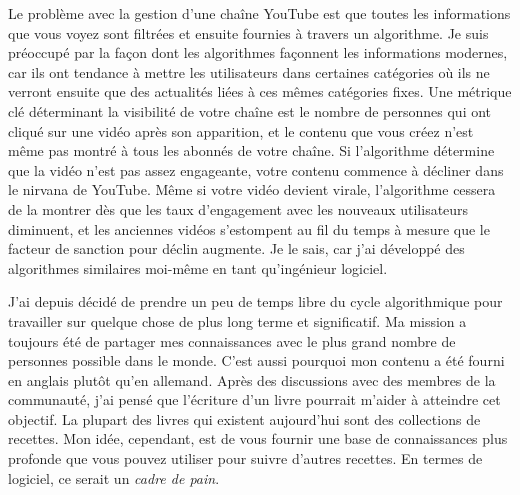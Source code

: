 Le problème avec la gestion d'une chaîne YouTube est que toutes les informations que vous voyez sont filtrées et ensuite fournies à travers un algorithme. Je suis préoccupé par la façon dont les algorithmes façonnent les informations modernes, car ils ont tendance à mettre les utilisateurs dans certaines catégories où ils ne verront ensuite que des actualités liées à ces mêmes catégories fixes. Une métrique clé déterminant la visibilité de votre chaîne est le nombre de personnes qui ont cliqué sur une vidéo après son apparition, et le contenu que vous créez n'est même pas montré à tous les abonnés de votre chaîne. Si l'algorithme détermine que la vidéo n'est pas assez engageante, votre contenu commence à décliner dans le nirvana de YouTube. Même si votre vidéo devient virale, l'algorithme cessera de la montrer dès que les taux d'engagement avec les nouveaux utilisateurs diminuent, et les anciennes vidéos s'estompent au fil du temps à mesure que le facteur de sanction pour déclin augmente. Je le sais, car j'ai développé des algorithmes similaires moi-même en tant qu'ingénieur logiciel.

J'ai depuis décidé de prendre un peu de temps libre du cycle algorithmique pour travailler sur quelque chose de plus long terme et significatif. Ma mission a toujours été de partager mes connaissances avec le plus grand nombre de personnes possible dans le monde. C'est aussi pourquoi mon contenu a été fourni en anglais plutôt qu'en allemand. Après des discussions avec des membres de la communauté, j'ai pensé que l'écriture d'un livre pourrait m'aider à atteindre cet objectif. La plupart des livres qui existent aujourd'hui sont des collections de recettes. Mon idée, cependant, est de vous fournir une base de connaissances plus profonde que vous pouvez utiliser pour suivre d'autres recettes.
En termes de logiciel, ce serait un \emph{cadre de pain}.

